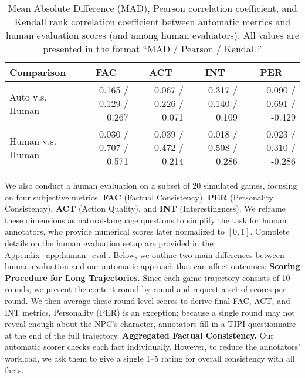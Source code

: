 \begin{table*}
    \centering
    \begin{tabular}{l|rrrr}
    \toprule
    Comparison     & \multicolumn{1}{c}{FAC} & \multicolumn{1}{c}{ACT} & \multicolumn{1}{c}{INT} & \multicolumn{1}{c}{PER} \\
    \midrule
    Auto v.s. Human     & 0.165 / 0.129 / 0.267 & 0.067 / 0.226 / 0.071 & 0.317 / 0.140 / 0.109 & 0.090 / -0.691 / -0.429 \\
    Human v.s. Human & 0.030 / 0.707 / 0.571 & 0.039 / 0.472 / 0.214 & 0.018 / 0.508 / 0.286 & 0.023 / -0.310 / -0.286\\
    \bottomrule
    \end{tabular}
    \caption{Mean Absolute Difference (MAD), Pearson correlation coefficient, and Kendall rank correlation coefficient between automatic metrics and human evaluation scores (and among human evaluators). All values are presented in the format ``MAD / Pearson / Kendall.''}
    \label{tab:gs_corr}
\end{table*}
We also conduct a human evaluation on a subset of 20 simulated games, focusing on four subjective metrics: \textbf{FAC} (Factual Consistency), \textbf{PER} (Personality Consistency), \textbf{ACT} (Action Quality), and \textbf{INT} (Interestingness). We reframe these dimensions as natural-language questions to simplify the task for human annotators, who provide numerical scores later normalized to \([0,1]\). Complete details on the human evaluation setup are provided in the Appendix~\ref{app:human_eval}. Below, we outline two main differences between human evaluation and our automatic approach that can affect outcomes: \textbf{Scoring Procedure for Long Trajectories.} 
    Since each game trajectory consists of 10 rounds, we present the content round by round and request a set of scores per round. We then average these round-level scores to derive final FAC, ACT, and INT metrics. Personality (PER) is an exception; because a single round may not reveal enough about the NPC's character, annotators fill in a TIPI questionnaire at the end of the full trajectory. \textbf{Aggregated Factual Consistency.}
    Our automatic scorer checks each fact individually. However, to reduce the annotators' workload, we ask them to give a single 1--5 rating for overall consistency with all facts.

